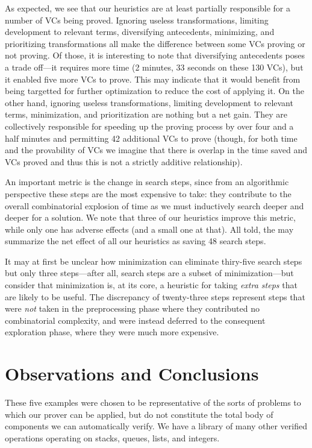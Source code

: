 As expected, we see that our heuristics are at least partially responsible for a number of VCs being proved.  Ignoring useless transformations, limiting development to relevant terms, diversifying antecedents, minimizing, and prioritizing transformations all make the difference between some VCs proving or not proving.  Of those, it is interesting to note that diversifying antecedents poses a trade off---it requires more time (2 minutes, 33 seconds on these 130 VCs), but it enabled five more VCs to prove.  This may indicate that it would benefit from being targetted for further optimization to reduce the cost of applying it.  On the other hand, ignoring useless transformations, limiting development to relevant terms, minimization, and prioritization are nothing but a net gain.  They are collectively responsible for speeding up the proving process by over four and a half minutes and permitting 42 additional VCs to prove (though, for both time and the provability of VCs we imagine that there is overlap in the time saved and VCs proved and thus this is not a strictly additive relationship).

An important metric is the change in search steps, since from an algorithmic perspective these steps are the most expensive to take: they contribute to the overall combinatorial explosion of time as we must inductively search deeper and deeper for a solution.  We note that three of our heuristics improve this metric, while only one has adverse effects (and a small one at that).  All told, the may summarize the net effect of all our heuristics as saving 48 search steps.

It may at first be unclear how minimization can eliminate thiry-five search steps but only three steps---after all, search steps are a subset of minimization---but consider that minimization is, at its core, a heuristic for taking \emph{extra steps} that are likely to be useful.  The discrepancy of twenty-three steps represent steps that were \emph{not} taken in the preprocessing phase where they contributed no combinatorial complexity, and were instead deferred to the consequent exploration phase, where they were much more expensive.


\section{Observations and Conclusions\label{proverEvalConclusion}}
These five examples were chosen to be representative of the sorts of problems to which our prover can be applied, but do not constitute the total body of components we can automatically verify.  We have a library of many other verified operations operating on stacks, queues, lists, and integers.

